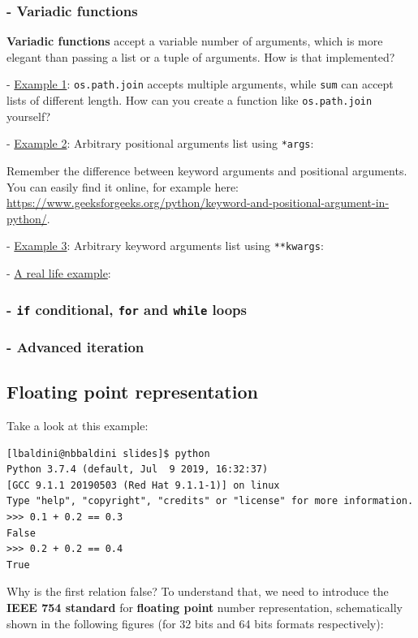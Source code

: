 

\subsubsection{- Variadic functions}
\textbf{Variadic functions} accept a variable number of arguments, which is more elegant than passing a list or a tuple of arguments. How is that implemented?

- \underline{Example 1}: \texttt{os.path.join} accepts multiple arguments, while \texttt{sum} can accept lists of different length. How can you create a function like \texttt{os.path.join} yourself?



\bigskip

- \underline{Example 2}: Arbitrary positional arguments list using \texttt{*args}:



Remember the difference between keyword arguments and positional arguments. You can easily find it online, for example here: \\ \url{https://www.geeksforgeeks.org/python/keyword-and-positional-argument-in-python/}.

\bigskip

- \underline{Example 3}: Arbitrary keyword arguments list using \texttt{**kwargs}:



\bigskip

- \underline{A real life example}:



\subsubsection{- \texttt{if} conditional, \texttt{for} and \texttt{while} loops}


\subsubsection{- Advanced iteration}


\subsection{Floating point representation}
Take a look at this example:
\begin{verbatim}
[lbaldini@nbbaldini slides]$ python
Python 3.7.4 (default, Jul  9 2019, 16:32:37)
[GCC 9.1.1 20190503 (Red Hat 9.1.1-1)] on linux
Type "help", "copyright", "credits" or "license" for more information.
>>> 0.1 + 0.2 == 0.3
False
>>> 0.2 + 0.2 == 0.4
True
\end{verbatim}
Why is the first relation false? To understand that, we need to introduce the \textbf{IEEE 754 standard} for \textbf{floating point} number representation, schematically shown in the following figures (for 32 bits and 64 bits formats respectively):

